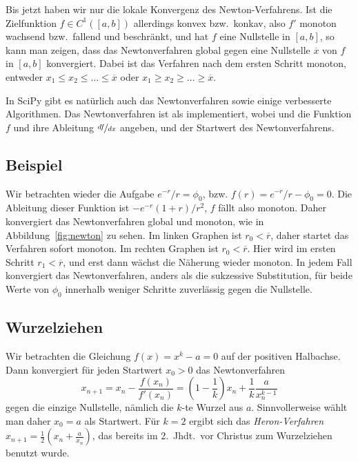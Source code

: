 Bis jetzt haben wir nur die lokale Konvergenz des
Newton-Verfahrens. Ist die Zielfunktion $f\in C^1([a,b])$ allerdings
konvex bzw.\ konkav, also $f'$ monoton wachsend bzw.\ fallend und
beschränkt, und hat $f$ eine Nullstelle in $[a,b]$, so kann man
zeigen, dass das Newtonverfahren global gegen eine Nullstelle
$\overline{x}$ von $f$ in $[a,b]$ konvergiert. Dabei ist das Verfahren
nach dem ersten Schritt monoton, \dh entweder $x_1\le
x_2\le\ldots\le\overline{x}$ oder $x_1\ge
x_2\ge\ldots\ge\overline{x}$.

In SciPy gibt es natürlich auch das Newtonverfahren sowie einige
verbesserte Algorithmen. Das Newtonverfahren ist als
 implementiert, wobei 
und  die Funktion $f$ und ihre Ableitung $\nicefrac{df}{dx}$
angeben, und  der Startwert des Newtonverfahrens.

\subsection{Beispiel}

Wir betrachten wieder die Aufgabe $e^{-r}/r = \phi_0$, bzw. $f(r) =
e^{-r}/r - \phi_0 = 0$. Die Ableitung dieser Funktion ist $-e^{-r}(1 +
r)/r^2$, $f$ fällt also monoton. Daher konvergiert das Newtonverfahren
global und monoton, wie in Abbildung~\ref{fig:newton} zu sehen. Im
linken Graphen ist $r_0<\overline{r}$, daher startet das Verfahren
sofort monoton. Im rechten Graphen ist $r_0 < \overline{r}$. Hier wird
im ersten Schritt $r_1 < \overline{r}$, und erst dann wächst die
Näherung wieder monoton. In jedem Fall konvergiert das
Newtonverfahren, anders als die sukzessive Substitution, für beide
Werte von $\phi_0$ innerhalb weniger Schritte zuverlässig gegen die
Nullstelle.

\subsection{Wurzelziehen}

Wir betrachten die Gleichung $f(x) = x^k - a = 0$ auf der positiven
Halbachse. Dann konvergiert für jeden Startwert $x_0>0$ das
Newtonverfahren
\begin{equation}
  x_{n+1} = x_n - \frac{f(x_n)}{f'(x_n)} = \left(1 -
    \frac{1}{k}\right) x_n + \frac{1}{k} \frac{a}{x_n^{k-1}}
\end{equation}
gegen die einzige Nullstelle, nämlich die $k$-te Wurzel aus
$a$. Sinnvollerweise wählt man daher $x_0=a$ als Startwert. Für $k=2$
ergibt sich das \emph{Heron-Verfahren} $x_{n+1} = \frac{1}{2}\left(x_n
  + \frac{a}{x_n}\right)$, das bereits im 2.\ Jhdt.\ vor Christus zum
Wurzelziehen benutzt wurde.

